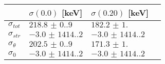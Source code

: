 \begin{tabular}{llll} \hline
\toprule 
 & $\sigma(0.0)$ [keV]  &  $\sigma(0.20)$ [keV]  \\ \midrule 
$\sigma_{tot}$ & $\num{218.8(0.9)}$ & $\num{182.2(1.0)}$\\ 
$\sigma_{str}$ & $\num{-3.0(1414.2)}$ & $\num{-3.0(1414.2)}$\\ 
$\sigma_{\theta}$ & $\num{202.5(0.9)}$ & $\num{171.3(1.0)}$\\ 
$\sigma_{0}$ & $\num{-3.0(1414.2)}$ & $\num{-3.0(1414.2)}$\\ 
 \bottomrule 
\end{tabular}
